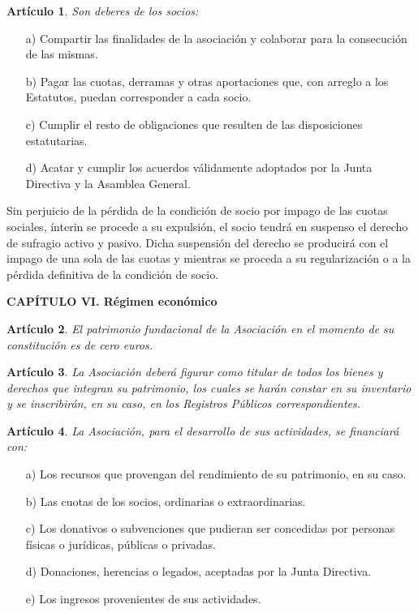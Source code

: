 \documentclass[a4paper,12pt]{article}
\theoremstyle{mystyle}		%
\newtheorem{art}{Artículo}	%
\begin{document}
\begin{onehalfspace}
\begin{art}
Son deberes de los socios:
\end{art}
\begin{itemize}
\item [a)] Compartir las finalidades de la asociación y colaborar para la consecución de las mismas.
\item [b)] Pagar las cuotas, derramas y otras aportaciones que, con arreglo a los Estatutos, puedan corresponder a cada socio.
\item [c)] Cumplir el resto de obligaciones que resulten de las disposiciones estatutarias.
\item [d)] Acatar y cumplir los acuerdos válidamente adoptados por la Junta Directiva y la Asamblea General.
\end{itemize}

Sin perjuicio de la pérdida de la condición de socio por impago de las cuotas sociales, ínterin se procede a su expulsión, el socio tendrá en suspenso el derecho de sufragio activo y pasivo. Dicha suspensión del derecho se producirá con el impago de una sola de las cuotas y mientras se proceda a su regularización o a la pérdida definitiva de la condición de socio.

\bigskip
\newpage
\begin{center}
\textbf{CAPÍTULO VI. Régimen económico}
\end{center}

\begin{art}
El patrimonio fundacional de la Asociación en el momento de su constitución es de cero euros.
\end{art}

\begin{art}
La Asociación deberá figurar como titular de todos los bienes y derechos que integran su patrimonio, los cuales se harán constar en su inventario y se inscribirán, en su caso, en los Registros Públicos correspondientes.
\end{art}

\begin{art}
La Asociación, para el desarrollo de sus actividades, se financiará con:
\end{art}
\begin{itemize}
\item [a)] Los recursos que provengan del rendimiento de su patrimonio, en su caso.
\item [b)] Las cuotas de los socios, ordinarias o extraordinarias.
\item [c)] Los donativos o subvenciones que pudieran ser concedidas por personas físicas o jurídicas, públicas o privadas.
\item [d)] Donaciones, herencias o legados, aceptadas por la Junta Directiva.
\item [e)] Los ingresos provenientes de sus actividades.
\end{itemize}


\end{onehalfspace}
\end{document}
